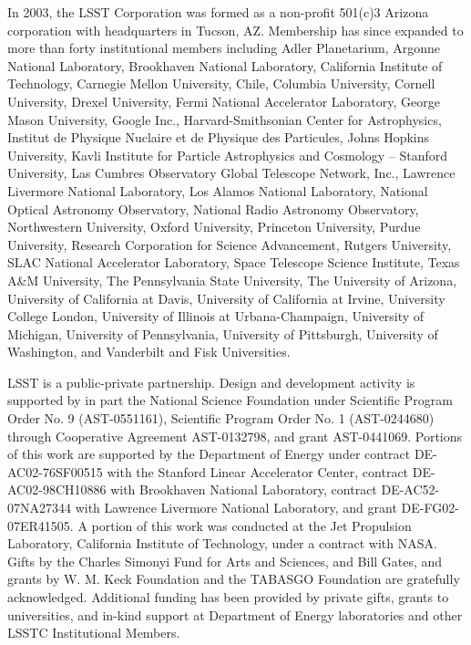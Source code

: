 \documentclass{emulateapj}
\begin{document}
In 2003, the LSST Corporation was formed as a non-profit 501(c)3 Arizona corporation 
with headquarters in Tucson, AZ.  Membership has since expanded to
more than forty institutional members 
including Adler Planetarium, Argonne National Laboratory, Brookhaven National Laboratory, California Institute of Technology,  
Carnegie Mellon University, Chile,  Columbia University, Cornell University, Drexel University, 
Fermi National Accelerator Laboratory, George Mason University, Google Inc., Harvard-Smithsonian 
Center for Astrophysics, Institut de Physique Nuclaire et de Physique des Particules, Johns Hopkins 
University, Kavli Institute for Particle Astrophysics and Cosmology -- Stanford University, Las 
Cumbres Observatory Global Telescope Network, Inc., Lawrence Livermore National Laboratory, 
Los Alamos National Laboratory,  National Optical Astronomy
Observatory, National Radio Astronomy Observatory, Northwestern
University, Oxford University, 
Princeton University, Purdue University, Research Corporation for Science Advancement, Rutgers 
University, SLAC National Accelerator Laboratory, Space Telescope Science Institute, 
Texas A\&M University, The Pennsylvania State University, The University of Arizona, University 
of California at Davis, University of California at Irvine, University College London, University of 
Illinois at Urbana-Champaign, University of Michigan, University of Pennsylvania, University of 
Pittsburgh, University of Washington, and Vanderbilt and Fisk Universities. 

LSST is a public-private partnership.  Design and development activity is
supported by in part the National Science Foundation under Scientific
Program Order No. 9 (AST-0551161), Scientific Program Order No. 1
(AST-0244680) through Cooperative Agreement AST-0132798, and grant AST-0441069. 
Portions of this work are supported by the Department of Energy under contract
DE-AC02-76SF00515 with the Stanford Linear Accelerator Center, contract
DE-AC02-98CH10886 with Brookhaven National Laboratory, contract
DE-AC52-07NA27344 with Lawrence Livermore National Laboratory, and grant
DE-FG02-07ER41505. A portion of this work was conducted at the Jet Propulsion 
Laboratory, California Institute of Technology, under a contract with NASA.
Gifts by the Charles Simonyi Fund for Arts and Sciences,
and Bill Gates, and grants by W. M. Keck Foundation and the TABASGO Foundation
are gratefully acknowledged. Additional funding has been provided by private gifts, grants 
to universities, and in-kind support at Department of Energy laboratories and other 
LSSTC Institutional Members.  
\end{document}
